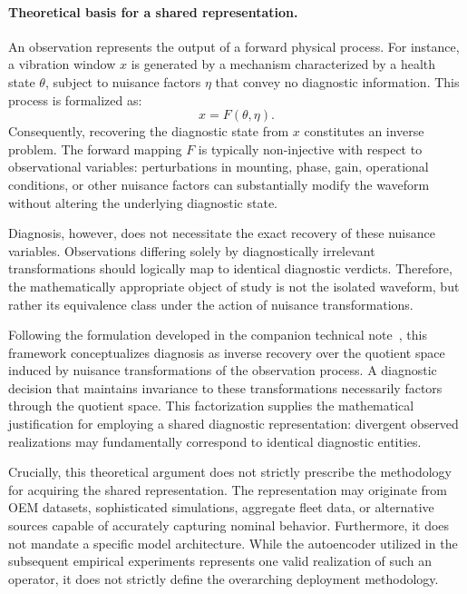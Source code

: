 \documentclass[a4paper]{cas-sc}
\begin{document}
\paragraph{Theoretical basis for a shared representation.}
An observation represents the output of a forward physical process. For instance, a vibration window \(x\) is generated by a mechanism characterized by a health state \(\theta\), subject to nuisance factors \(\eta\) that convey no diagnostic information. This process is formalized as:
\[
    x = F(\theta,\eta).
\]
Consequently, recovering the diagnostic state from \(x\) constitutes an inverse problem. The forward mapping \(F\) is typically non-injective with respect to observational variables: perturbations in mounting, phase, gain, operational conditions, or other nuisance factors can substantially modify the waveform without altering the underlying diagnostic state.

Diagnosis, however, does not necessitate the exact recovery of these nuisance variables. Observations differing solely by diagnostically irrelevant transformations should logically map to identical diagnostic verdicts. Therefore, the mathematically appropriate object of study is not the isolated waveform, but rather its equivalence class under the action of nuisance transformations.

Following the formulation developed in the companion technical note~\citep{disanti2026quotient}, this framework conceptualizes diagnosis as inverse recovery over the quotient space induced by nuisance transformations of the observation process. A diagnostic decision that maintains invariance to these transformations necessarily factors through the quotient space. This factorization supplies the mathematical justification for employing a shared diagnostic representation: divergent observed realizations may fundamentally correspond to identical diagnostic entities.

Crucially, this theoretical argument does not strictly prescribe the methodology for acquiring the shared representation. The representation may originate from OEM datasets, sophisticated simulations, aggregate fleet data, or alternative sources capable of accurately capturing nominal behavior. Furthermore, it does not mandate a specific model architecture. While the autoencoder utilized in the subsequent empirical experiments represents one valid realization of such an operator, it does not strictly define the overarching deployment methodology.
\end{document}
